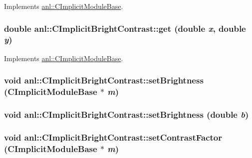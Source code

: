 Implements \hyperlink{classanl_1_1CImplicitModuleBase_ac17d592612c82ba3d47f9229a00b1fe3}{anl::CImplicitModuleBase}.\hypertarget{classanl_1_1CImplicitBrightContrast_a8b6d690936515565c8147eddcb2adbee}{
\subsubsection[{get}]{\setlength{\rightskip}{0pt plus 5cm}double anl::CImplicitBrightContrast::get (double {\em x}, \/  double {\em y})}}
\label{classanl_1_1CImplicitBrightContrast_a8b6d690936515565c8147eddcb2adbee}


Implements \hyperlink{classanl_1_1CImplicitModuleBase_ab88f8a1822dcfbc13ba5230318b0acd1}{anl::CImplicitModuleBase}.\hypertarget{classanl_1_1CImplicitBrightContrast_aedca3e206e044ba89d43e1768079f1ec}{
\subsubsection[{setBrightness}]{\setlength{\rightskip}{0pt plus 5cm}void anl::CImplicitBrightContrast::setBrightness ({\bf CImplicitModuleBase} $\ast$ {\em m})}}
\label{classanl_1_1CImplicitBrightContrast_aedca3e206e044ba89d43e1768079f1ec}
\hypertarget{classanl_1_1CImplicitBrightContrast_aa996e46743f6045cbae0eba7bcdb5f41}{
\subsubsection[{setBrightness}]{\setlength{\rightskip}{0pt plus 5cm}void anl::CImplicitBrightContrast::setBrightness (double {\em b})}}
\label{classanl_1_1CImplicitBrightContrast_aa996e46743f6045cbae0eba7bcdb5f41}
\hypertarget{classanl_1_1CImplicitBrightContrast_a556e2ce291391f68988c9ceb1dbf977e}{
\subsubsection[{setContrastFactor}]{\setlength{\rightskip}{0pt plus 5cm}void anl::CImplicitBrightContrast::setContrastFactor ({\bf CImplicitModuleBase} $\ast$ {\em m})}}
